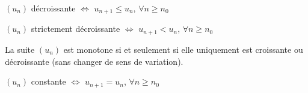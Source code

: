 \documentclass[11pt]{article}
\begin{document}
\begin{definition}
$(u_n)$ décroissante $\iff$ $u_{n+1}
\le u_n$, $\forall n \ge n_0$
\end{definition}

\begin{exemple}

\end{exemple}

\begin{definition}
$(u_n)$ strictement décroissante $\iff$ $u_{n+1}
< u_n$, $\forall n \ge n_0$
\end{definition}

\begin{exemple}

\end{exemple}

\begin{definition}
La suite $(u_n)$ est monotone si et
seulement si elle uniquement est croissante ou décroissante (sans
changer de sens de variation).
\end{definition}

\begin{exemple}

\end{exemple}

\begin{definition}
$(u_n)$ constante $\iff$ $u_{n+1}
= u_n$, $\forall n \ge n_0$
\end{definition}

\begin{exemple}

\end{exemple}

\begin{comment}
Méthode : Calculer les premiers termes d'une suite Méthode :
Représenter graphiquement une suite dé�nie de manière explicite
Méthode : Représenter graphiquement une suite dé�nie par récurrence
Méthode : Montrer qu'une suite est bornée Méthode : Montrer qu'une
suite est arithmétique et donner sa forme explicite Méthode : Montrer
qu'une suite est géométrique et donner sa forme explicite Méthode :
Calculer une somme de termes consécutifs d'une suite Exercice :
Calculer les premiers termes d'une suite dé�nie de manière explicite
Exercice : Calculer les premiers termes d'une suite dé�nie par
récurrence Exercice : Montrer qu'une suite est bornée Exercice :
Déterminer si une suite est arithmétique Exercice : Calculer les
termes d'une suite arithmétique Exercice : Déterminer le premier terme
et la raison d'une suite arithmétique Exercice : Calculer la somme des
termes consécutifs d'une suite arithmétique Exercice : Déterminer si
une suite est géométrique Exercice : Calculer les termes d'une suite
géométrique Exercice : Déterminer le premier terme et la raison d'une
suite géométrique Exercice : Calculer la somme des termes consécutifs
d'une suite géométrique Exercice : Calculer une somme Problème :
Raison et premier terme d'une suite arithmétique à partir d'un système
Problème : Etudier deux suites imbriquées Problème : Utilisation d'une
suite géométrique dans une situation réelle Problème : Etudier une
suite géométrique et un taux d'intérêt
\end{comment}
\end{document}
